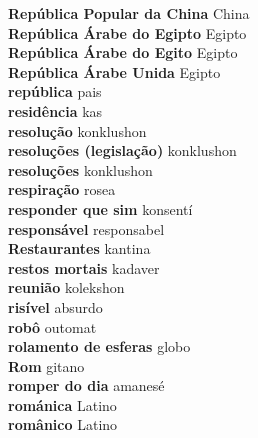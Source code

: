 \textbf{ República Popular da China  } China \\
\textbf{ República Árabe do Egipto  } Egipto \\
\textbf{ República Árabe do Egito  } Egipto \\
\textbf{ República Árabe Unida  } Egipto \\
\textbf{ república  } pais \\
\textbf{ residência  } kas \\
\textbf{ resolução  } konklushon \\
\textbf{ resoluções (legislação)  } konklushon \\
\textbf{ resoluções  } konklushon \\
\textbf{ respiração  } rosea \\
\textbf{ responder que sim  } konsentí \\
\textbf{ responsável  } responsabel \\
\textbf{ Restaurantes  } kantina \\
\textbf{ restos mortais  } kadaver \\
\textbf{ reunião  } kolekshon \\
\textbf{ risível  } absurdo \\
\textbf{ robô  } outomat \\
\textbf{ rolamento de esferas  } globo \\
\textbf{ Rom  } gitano \\
\textbf{ romper do dia  } amanesé \\
\textbf{ románica  } Latino \\
\textbf{ românico  } Latino \\
